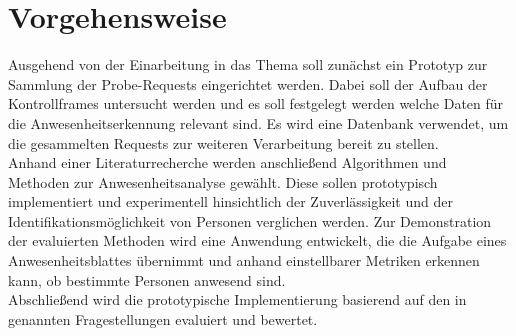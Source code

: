 \section{Vorgehensweise}\label{approach}
Ausgehend von der Einarbeitung in das Thema soll zunächst ein Prototyp zur Sammlung der Probe-Requests eingerichtet werden.
Dabei soll der Aufbau der Kontrollframes untersucht werden und es soll festgelegt werden welche Daten für die Anwesenheitserkennung relevant sind.
Es wird eine Datenbank verwendet, um die gesammelten Requests zur weiteren Verarbeitung bereit zu stellen.
\\

Anhand einer Literaturrecherche werden anschließend Algorithmen und Methoden zur Anwesenheitsanalyse gewählt.
Diese sollen prototypisch implementiert und experimentell hinsichtlich der Zuverlässigkeit und der Identifikationsmöglichkeit von Personen verglichen werden.
Zur Demonstration der evaluierten Methoden wird eine Anwendung entwickelt, die die Aufgabe eines Anwesenheitsblattes übernimmt und anhand einstellbarer Metriken erkennen kann, ob bestimmte Personen anwesend sind.
\\

Abschließend wird die prototypische Implementierung basierend auf den in  genannten Fragestellungen evaluiert und bewertet.
